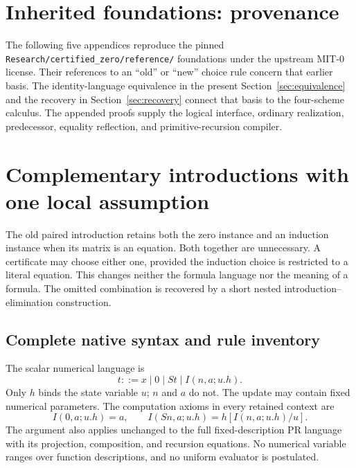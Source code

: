 \documentclass[11pt]{article}
\theoremstyle{definition}
\begin{document}
\clearpage
\section*{Inherited foundations: provenance}
The following five appendices reproduce the pinned
\nolinkurl{Research/certified_zero/reference/} foundations under the upstream
MIT-0 license. Their references to an ``old'' or ``new'' choice rule concern
that earlier basis. The identity-language equivalence in the present
Section~\ref{sec:equivalence} and the recovery in
Section~\ref{sec:recovery} connect that basis to the four-scheme calculus.
The appended proofs supply the logical interface, ordinary realization,
predecessor, equality reflection, and primitive-recursion compiler.


\section{Complementary introductions with one local assumption}
\label{sec:choice-introduction}

The old paired introduction retains both the zero instance and an
induction instance when its matrix is an equation. Both together are
unnecessary. A certificate may choose either one, provided the induction
choice is restricted to a literal equation. This changes neither the
formula language nor the meaning of a formula. The omitted combination
is recovered by a short nested introduction--elimination construction.

\subsection{Complete native syntax and rule inventory}

The scalar numerical language is
\[
 t::=x\mid0\mid St\mid I(n,a;u.h).
\]
Only $h$ binds the state variable $u$; $n$ and $a$ do not.
The update may contain fixed numerical parameters. The computation
axioms in every retained context are
\[
 I(0,a;u.h)=a,\qquad
 I(Sn,a;u.h)=h[I(n,a;u.h)/u].
 \tag{I0, IS}\label{eq:choice-computations}
\]
The argument also applies unchanged to the full fixed-description PR
language with its projection, composition, and recursion equations.
No numerical variable ranges over function descriptions, and no uniform
evaluator is postulated.
\end{document}
